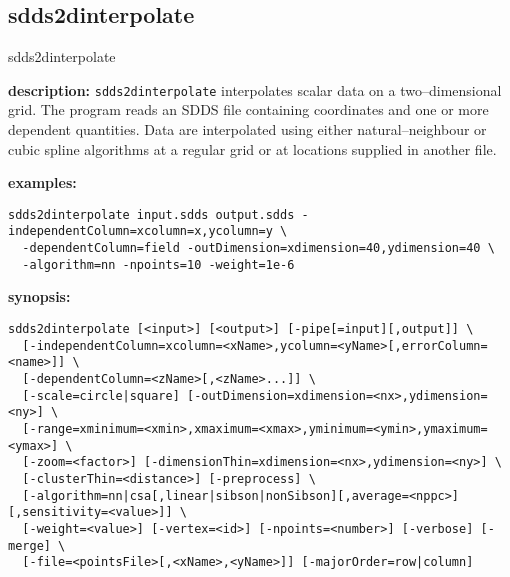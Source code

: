 \newpage
\subsection{sdds2dinterpolate}
\label{sdds2dinterpolate}

\begin{sddsprog}{sdds2dinterpolate}
  \item \textbf{description:}
    \verb|sdds2dinterpolate| interpolates scalar data on a two--dimensional grid. The program reads an SDDS file containing coordinates and one or more dependent quantities. Data are interpolated using either natural--neighbour or cubic spline algorithms at a regular grid or at locations supplied in another file.

  \item \textbf{examples:}
  \begin{verbatim}
sdds2dinterpolate input.sdds output.sdds -independentColumn=xcolumn=x,ycolumn=y \
  -dependentColumn=field -outDimension=xdimension=40,ydimension=40 \
  -algorithm=nn -npoints=10 -weight=1e-6
  \end{verbatim}

  \item \textbf{synopsis:}
  \begin{verbatim}
sdds2dinterpolate [<input>] [<output>] [-pipe[=input][,output]] \
  [-independentColumn=xcolumn=<xName>,ycolumn=<yName>[,errorColumn=<name>]] \
  [-dependentColumn=<zName>[,<zName>...]] \
  [-scale=circle|square] [-outDimension=xdimension=<nx>,ydimension=<ny>] \
  [-range=xminimum=<xmin>,xmaximum=<xmax>,yminimum=<ymin>,ymaximum=<ymax>] \
  [-zoom=<factor>] [-dimensionThin=xdimension=<nx>,ydimension=<ny>] \
  [-clusterThin=<distance>] [-preprocess] \
  [-algorithm=nn|csa[,linear|sibson|nonSibson][,average=<nppc>][,sensitivity=<value>]] \
  [-weight=<value>] [-vertex=<id>] [-npoints=<number>] [-verbose] [-merge] \
  [-file=<pointsFile>[,<xName>,<yName>]] [-majorOrder=row|column]
  \end{verbatim}


\end{sddsprog}
